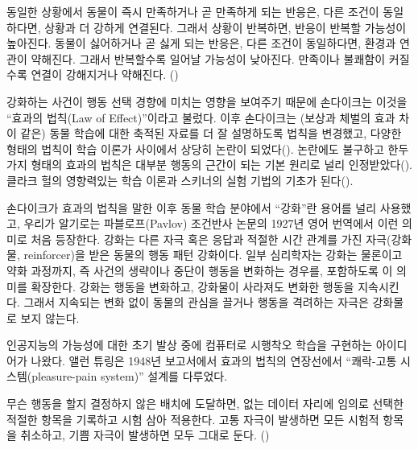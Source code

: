 \begin{displayquote}
동일한 상황에서 동물이 즉시 만족하거나 곧 만족하게 되는 반응은, 다른 조건이
동일하다면, 상황과 더 강하게 연결된다. 그래서 상황이 반복하면, 반응이 반복할
가능성이 높아진다. 동물이 싫어하거나 곧 싫게 되는 반응은, 다른 조건이
동일하다면, 환경과 연관이 약해진다. 그래서 반복할수록 일어날 가능성이 낮아진다.
만족이나 불쾌함이 커질수록 연결이 강해지거나 약해진다.
(\cite[p.~244]{Thorndike1911})
\end{displayquote}

강화하는 사건이 행동 선택 경향에 미치는 영향을 보여주기 때문에 손다이크는 이것을
``효과의 법칙(Law of Effect)''이라고 불렀다. 이후 손다이크는 (보상과 체벌의 효과
차이 같은) 동물 학습에 대한 축적된 자료를 더 잘 설명하도록 법칙을 변경했고,
다양한 형태의 법칙이 학습 이론가 사이에서 상당히 논란이
되었다(\cite[예,][참고]{Gallistel2005, Herrnstein1970, Kimble1961, Kimble1967,
Mazur1994}). 논란에도 불구하고 한두 가지 형태의 효과의 법칙은 대부분 행동의
근간이 되는 기본 원리로 널리 인정받았다(\cite[예,][]{HilgardBower1975,
Dennett1978, Campbell1960, Cziko1995}). 클라크 헐의 영향력있는 학습 이론과
스키너의 실험 기법의 기초가 된다(\cite[예,][]{Hull1943, Skinner1938}).


손다이크가 효과의 법칙을 말한 이후 동물 학습 분야에서 ``강화''란 용어를 널리
사용했고, 우리가 알기로는 파블로프(Pavlov) 조건반사 논문의 1927년 영어 번역에서
이런 의미로 처음 등장한다.  강화는 다른 자극 혹은 응답과 적절한 시간 관계를 가진
자극(강화물, reinforcer)을 받은 동물의 행동 패턴 강화이다. 일부 심리학자는
강화는 물론이고 약화 과정까지, 즉 사건의 생략이나 중단이 행동을 변화하는 경우를,
포함하도록 이 의미를 확장한다. 강화는 행동을 변화하고, 강화물이 사라져도 변화한
행동을 지속시킨다. 그래서 지속되는 변화 없이 동물의 관심을 끌거나 행동을
격려하는 자극은 강화물로 보지 않는다.

인공지능의 가능성에 대한 초기 발상 중에 컴퓨터로 시행착오 학습을 구현하는
아이디어가 나왔다. 앨런 튜링은 1948년 보고서에서 효과의 법칙의 연장선에서
``쾌락-고통 시스템(pleasure-pain system)'' 설계를 다루었다.

\begin{displayquote}
무슨 행동을 할지 결정하지 않은 배치에 도달하면, 없는 데이터 자리에 임의로 선택한
적절한 항목을 기록하고 시험 삼아 적용한다. 고통 자극이 발생하면 모든 시험적
항목을 취소하고, 기쁨 자극이 발생하면 모두 그대로 둔다. (\cite{Turing1948})
\end{displayquote}

